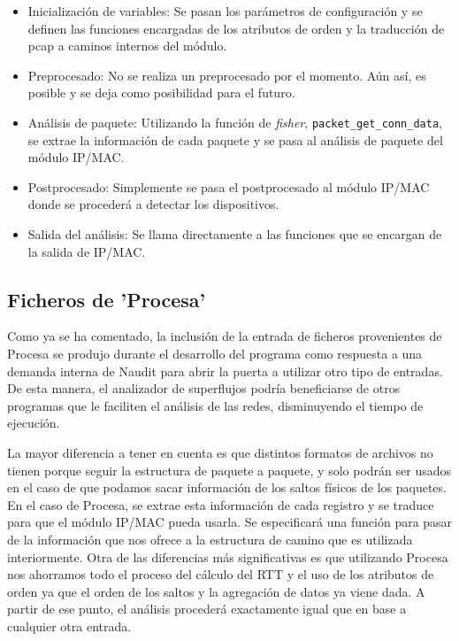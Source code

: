 \documentclass[twoside, 12pt]{epstfg}
\begin{document}
\begin{itemize}
	\item{Inicialización de variables: }Se pasan los parámetros de configuración y se definen las funciones encargadas de los atributos de orden y la traducción de pcap a caminos internos del módulo.
	\item{Preprocesado: }No se realiza un preprocesado por el momento. Aún así, es posible y se deja como posibilidad para el futuro.
	\item{Análisis de paquete: }Utilizando la función de \textit{fisher}, \texttt{packet\_get\_conn\_data}, se extrae la información de cada paquete y se pasa al análisis de paquete del módulo IP/MAC.
	\item{Postprocesado: }Simplemente se pasa el postprocesado al módulo IP/MAC donde se procederá a detectar los dispositivos.
	\item{Salida del análisis: }Se llama directamente a las funciones que se encargan de la salida de IP/MAC.
\end{itemize}

\subsection{Ficheros de 'Procesa'}
Como ya se ha comentado, la inclusión de la entrada de ficheros provenientes de Procesa se produjo durante el desarrollo del programa como respuesta a una demanda interna de Naudit para abrir la puerta a utilizar otro tipo de entradas. De esta manera, el analizador de superflujos podría beneficiarse de otros programas que le faciliten el análisis de las redes, disminuyendo el tiempo de ejecución. 

La mayor diferencia a tener en cuenta es que distintos formatos de archivos no tienen porque seguir la estructura de paquete a paquete, y solo podrán ser usados en el caso de que podamos sacar información de los saltos físicos de los paquetes. En el caso de Procesa, se extrae esta información de cada registro y se traduce para que el módulo IP/MAC pueda usarla. Se especificará una función para pasar de la información que nos ofrece a la estructura de camino que es utilizada interiormente. Otra de las diferencias más significativas es que utilizando Procesa nos ahorramos todo el proceso del cálculo del RTT y el uso de los atributos de orden ya que el orden de los saltos y la agregación de datos ya viene dada. A partir de ese punto, el análisis procederá exactamente igual que en base a cualquier otra entrada.
\end{document}
